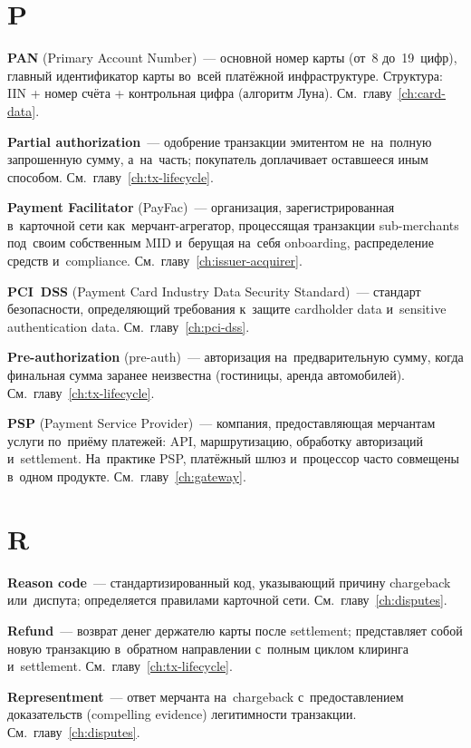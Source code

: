 \section*{P}

\textbf{PAN} (Primary Account Number)~--- основной номер карты
(от~8 до~19~цифр), главный идентификатор карты во~всей платёжной
инфраструктуре. Структура: IIN + номер счёта + контрольная цифра
(алгоритм Луна). См.~главу~\ref{ch:card-data}.

\textbf{Partial authorization}~--- одобрение транзакции
эмитентом не~на~полную запрошенную сумму, а~на~часть; покупатель
доплачивает оставшееся иным
способом. См.~главу~\ref{ch:tx-lifecycle}.

\textbf{Payment Facilitator} (PayFac)~--- организация,
зарегистрированная в~карточной сети как~мерчант-агрегатор,
процессящая транзакции sub-merchants под~своим собственным MID
и~берущая на~себя onboarding, распределение средств
и~compliance. См.~главу~\ref{ch:issuer-acquirer}.

\textbf{PCI~DSS} (Payment Card Industry Data Security
Standard)~--- стандарт безопасности, определяющий требования
к~защите cardholder data и~sensitive authentication
data. См.~главу~\ref{ch:pci-dss}.

\textbf{Pre-authorization} (pre-auth)~--- авторизация
на~предварительную сумму, когда финальная сумма заранее
неизвестна (гостиницы, аренда
автомобилей). См.~главу~\ref{ch:tx-lifecycle}.

\textbf{PSP} (Payment Service Provider)~--- компания,
предоставляющая мерчантам услуги по~приёму платежей: API,
маршрутизацию, обработку авторизаций и~settlement. На~практике
PSP, платёжный шлюз и~процессор часто совмещены в~одном
продукте. См.~главу~\ref{ch:gateway}.


\section*{R}

\textbf{Reason code}~--- стандартизированный код, указывающий
причину chargeback или~диспута; определяется правилами карточной
сети. См.~главу~\ref{ch:disputes}.

\textbf{Refund}~--- возврат денег держателю карты после
settlement; представляет собой новую транзакцию в~обратном
направлении с~полным циклом клиринга
и~settlement. См.~главу~\ref{ch:tx-lifecycle}.

\textbf{Representment}~--- ответ мерчанта на~chargeback
с~предоставлением доказательств (compelling evidence)
легитимности транзакции. См.~главу~\ref{ch:disputes}.

